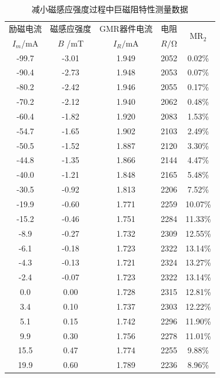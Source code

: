 \documentclass{thuemp}
\begin{document}
\begin{table}[H]
    \centering
    \captionnamefont{\wuhao\bf\heiti}
    \captiontitlefont{\wuhao\bf\heiti}
    \caption{减小磁感应强度过程中巨磁阻特性测量数据} \label{tab:magnetoresistance_desc}
    \liuhao
    \begin{tabular}{ccccc}
        \toprule
        励磁电流 & 磁感应强度 & GMR器件电流 & 电阻 & \multirow{2}{*}{$\mathrm{MR_2}$}\\
        $I_m$/\si{\milli\ampere} & $B$ /\si{\milli\tesla} & $I_R$$ /\si{\milli\ampere}$ & $R$$/\si{\ohm} $& \\
        \midrule
        -99.7 & -3.01 & 1.949 & 2052 &  0.02\%  \\
        -90.4 & -2.73 & 1.948 & 2053 &  0.07\%  \\
        -80.2 & -2.42 & 1.946 & 2055 &  0.17\%  \\
        -70.2 & -2.12 & 1.940 & 2062 &  0.48\%  \\
        -60.4 & -1.82 & 1.920 & 2083 &  1.53\%  \\
        -54.7 & -1.65 & 1.902 & 2103 &  2.49\%  \\
        -50.5 & -1.52 & 1.887 & 2120 &  3.30\%  \\
        -44.8 & -1.35 & 1.866 & 2144 &  4.47\%  \\
        -40.0 & -1.21 & 1.848 & 2165 &  5.48\%  \\
        -30.5 & -0.92 & 1.813 & 2206 &  7.52\%  \\
        -19.9 & -0.60 & 1.771 & 2259 & 10.07\%  \\
        -15.2 & -0.46 & 1.751 & 2284 & 11.33\%  \\
        -8.9  & -0.27 & 1.732 & 2309 & 12.55\%  \\
        -6.1  & -0.18 & 1.723 & 2322 & 13.14\%  \\
        -4.3  & -0.13 & 1.721 & 2324 & 13.27\%  \\
        -2.4  & -0.07 & 1.723 & 2322 & 13.14\%  \\
        0.0   & 0.00  & 1.728 & 2315 & 12.81\%  \\
        3.4   & 0.10  & 1.737 & 2303 & 12.22\%  \\
        5.1   & 0.15  & 1.742 & 2296 & 11.90\%  \\
        9.9   & 0.30  & 1.756 & 2278 & 11.01\%  \\
        15.5  & 0.47  & 1.774 & 2255 &  9.88\%  \\
        19.9  & 0.60  & 1.789 & 2236 &  8.96\%  \\

\end{tabular}
\end{table}
\end{document}
